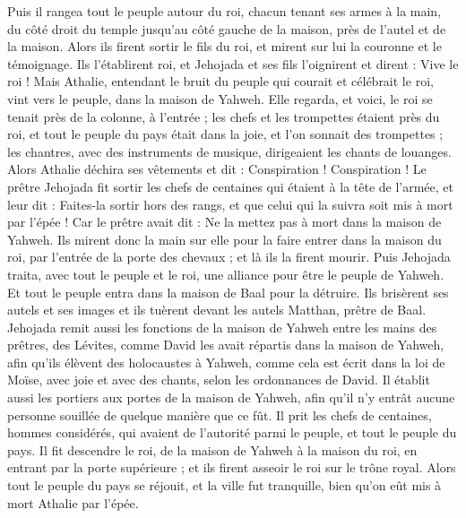 \begin{multicols}{2}
Puis il rangea tout le peuple autour du roi, chacun tenant ses armes à la main, du côté droit du temple jusqu'au côté gauche de la maison, près de l'autel et de la maison.
Alors ils firent sortir le fils du roi, et mirent sur lui la couronne et le témoignage. Ils l'établirent roi, et Jehojada et ses fils l'oignirent et dirent : Vive le roi !
Mais Athalie, entendant le bruit du peuple qui courait et célébrait le roi, vint vers le peuple, dans la maison de Yahweh.
Elle regarda, et voici, le roi se tenait près de la colonne, à l'entrée ; les chefs et les trompettes étaient près du roi, et tout le peuple du pays était dans la joie, et l'on sonnait des trompettes ; les chantres, avec des instruments de musique, dirigeaient les chants de louanges. Alors Athalie déchira ses vêtements et dit : Conspiration ! Conspiration !
Le prêtre Jehojada fit sortir les chefs de centaines qui étaient à la tête de l'armée, et leur dit : Faites-la sortir hors des rangs, et que celui qui la suivra soit mis à mort par l'épée ! Car le prêtre avait dit : Ne la mettez pas à mort dans la maison de Yahweh.
Ils mirent donc la main sur elle pour la faire entrer dans la maison du roi, par l'entrée de la porte des chevaux ; et là ils la firent mourir.
Puis Jehojada traita, avec tout le peuple et le roi, une alliance pour être le peuple de Yahweh.
Et tout le peuple entra dans la maison de Baal pour la détruire. Ils brisèrent ses autels et ses images et ils tuèrent devant les autels Matthan, prêtre de Baal.
Jehojada remit aussi les fonctions de la maison de Yahweh entre les mains des prêtres, des Lévites, comme David les avait répartis dans la maison de Yahweh, afin qu'ils élèvent des holocaustes à Yahweh, comme cela est écrit dans la loi de Moïse, avec joie et avec des chants, selon les ordonnances de David.
Il établit aussi les portiers aux portes de la maison de Yahweh, afin qu'il n'y entrât aucune personne souillée de quelque manière que ce fût.
Il prit les chefs de centaines, hommes considérés, qui avaient de l'autorité parmi le peuple, et tout le peuple du pays. Il fit descendre le roi, de la maison de Yahweh à la maison du roi, en entrant par la porte supérieure ; et ils firent asseoir le roi sur le trône royal.
Alors tout le peuple du pays se réjouit, et la ville fut tranquille, bien qu'on eût mis à mort Athalie par l'épée.

\end{multicols}
